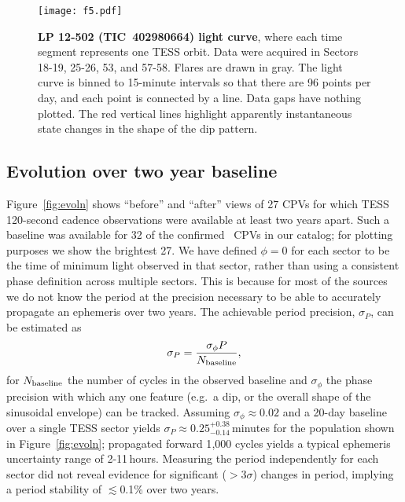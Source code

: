 \documentclass[11pt,twocolumn,tighten]{aastex63}
\begin{document}
\begin{figure*}[!tp]
	\begin{center}
		\centering
		\texttt{[image: f5.pdf]}
		\vspace{-0.3cm}
		\caption{
      {\bf LP 12-502 (TIC~402980664) light curve}, where each time
      segment represents one TESS orbit.  Data were acquired in
      Sectors 18-19, 25-26, 53, and 57-58.  Flares are drawn in gray.
      The light curve is binned to 15-minute intervals so that there
      are 96 points per day, and each point is connected by a line.
      Data gaps have nothing plotted.  The red vertical lines
      highlight apparently instantaneous state changes in the shape of
      the dip pattern.  
		}
		\label{fig:lplc}
	\end{center}
\end{figure*}


\subsection{Evolution over two year baseline}
\label{subsec:twoyear}

Figure~\ref{fig:evoln} shows ``before'' and ``after'' views of 27 CPVs
for which TESS 120-second cadence observations were available at least
two years apart.  Such a baseline was available for 32 of the
confirmed \ngoods\ CPVs in our catalog; for plotting purposes we show
the brightest 27.  
We have defined $\phi=0$ for each sector to be the time of minimum
light observed in that sector, rather than using a consistent phase
definition across multiple sectors.
This is because for most of the sources we do not know the period at the
precision necessary to be able to accurately propagate an ephemeris
over two years.  The achievable period precision, $\sigma_P$, can be
estimated as
\begin{equation}
  \sigma_{P} = \frac { \sigma_{\phi} P } { N_{\rm baseline} },
  \label{eq:periodprecision}
\end{equation}
for $N_{\rm baseline}$ the number of cycles in the observed baseline
and $\sigma_{\phi}$ the phase precision with which any one feature
(e.g.~a dip, or the overall shape of the sinusoidal envelope) can be
tracked.  Assuming $\sigma_\phi$$\approx$$0.02$ and a 20-day baseline
over a single TESS sector yields
$\sigma_{P}$$\approx$$0.25^{+0.38}_{-0.14}$\,minutes for the
population shown in Figure~\ref{fig:evoln}; propagated forward 1{,}000
cycles yields a typical ephemeris uncertainty range of 2-11\,hours.
Measuring the period independently for each sector did not reveal
evidence for significant ($>$3$\sigma$) changes in period, implying
a period stability of $\lesssim$0.1\% over two years.
\end{document}
